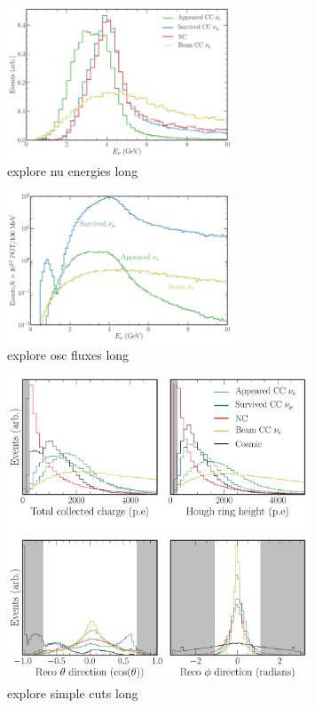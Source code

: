 \begin{figure} %
    \includegraphics[width=0.6\textwidth]{diagrams/7-cvn/chipsnet/explore_nu_energies.pdf}
    \caption[explore nu energies short]
    {explore nu energies long}
    \label{fig:explore_nu_energies}
\end{figure}

\begin{figure} %
    \includegraphics[width=0.6\textwidth]{diagrams/7-cvn/chipsnet/explore_osc_fluxes.pdf}
    \caption[explore osc fluxes short]
    {explore osc fluxes long}
    \label{fig:explore_osc_fluxes}
\end{figure}

\begin{figure} %
    \includegraphics[width=0.8\textwidth]{diagrams/7-cvn/chipsnet/explore_simple_cuts.pdf}
    \caption[explore simple cuts short]
    {explore simple cuts long}
    \label{fig:explore_simple_cuts}
\end{figure}

